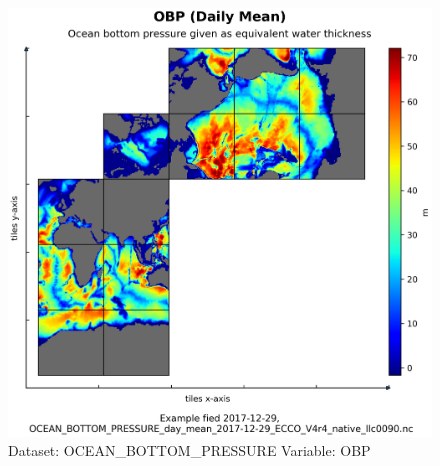 \begin{figure}[H]
\centering
\includegraphics[width=\textwidth]{../images/plots/native_plots/Ocean_Bottom_Pressure/OBP.png}
\caption{Dataset: OCEAN\_BOTTOM\_PRESSURE Variable: OBP}
\label{tab:table-OCEAN_BOTTOM_PRESSURE_OBP-Plot}
\end{figure}
\pagebreak
